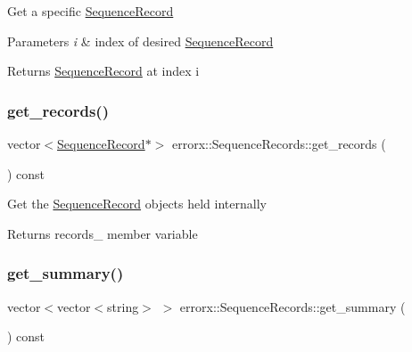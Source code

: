 Get a specific \mbox{\hyperlink{classerrorx_1_1_sequence_record}{Sequence\+Record}}


\begin{DoxyParams}{Parameters}
{\em i} & index of desired \mbox{\hyperlink{classerrorx_1_1_sequence_record}{Sequence\+Record}}\\
\hline
\end{DoxyParams}
\begin{DoxyReturn}{Returns}
\mbox{\hyperlink{classerrorx_1_1_sequence_record}{Sequence\+Record}} at index i 
\end{DoxyReturn}
\mbox{\label{classerrorx_1_1_sequence_records_a9242317332845a8795864556c72ff1e3}} 
\subsubsection{\texorpdfstring{get\+\_\+records()}{get\_records()}}
{\footnotesize\ttfamily vector$<$\mbox{\hyperlink{classerrorx_1_1_sequence_record}{Sequence\+Record}}$\ast$$>$ errorx\+::\+Sequence\+Records\+::get\+\_\+records (\begin{DoxyParamCaption}{ }\end{DoxyParamCaption}) const}

Get the \mbox{\hyperlink{classerrorx_1_1_sequence_record}{Sequence\+Record}} objects held internally

\begin{DoxyReturn}{Returns}
records\+\_\+ member variable 
\end{DoxyReturn}
\mbox{\label{classerrorx_1_1_sequence_records_a426a62dad84bd4fe3a94a955c7b92330}} 
\subsubsection{\texorpdfstring{get\+\_\+summary()}{get\_summary()}}
{\footnotesize\ttfamily vector$<$vector$<$string$>$ $>$ errorx\+::\+Sequence\+Records\+::get\+\_\+summary (\begin{DoxyParamCaption}{ }\end{DoxyParamCaption}) const}

